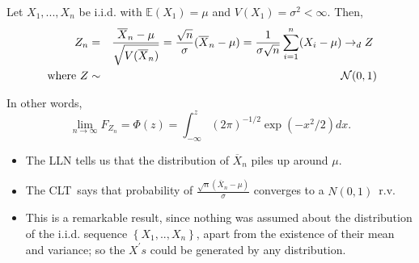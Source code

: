 \documentclass[notes=show]{beamer}
\begin{document}
\begin{frame}%


\begin{theorem}
Let $X_{1},...,X_{n}$ be i.i.d. with $\mathbb{E}\left( X_{1}\right) =\mu $
and $V\left( X_{1}\right) =\sigma ^{2}<\infty .$ Then, 
\begin{eqnarray*}
Z_{n} &=&\frac{\overline{X}_{n}-\mu }{\sqrt{V(\overline{X}_{n})}}=\frac{%
\sqrt{n}}{\sigma }(\overline{X}_{n}-\mu )=\frac{1}{\sigma \sqrt{n}}%
\sum_{i=1}^{n}(X_{i}-\mu )\rightarrow _{d}Z\text{ } \\
\text{\ where }Z &\sim &\mathcal{N}(0,1)
\end{eqnarray*}

In other words, 
\begin{equation*}
\lim_{n\rightarrow \infty }F_{Z_{n}}=\Phi (z)=\int_{-\infty }^{z}(2\pi
)^{-1/2}\exp (-x^{2}/2)dx.
\end{equation*}
\end{theorem}

\end{frame}%

\begin{frame}%


\begin{itemize}
\item The LLN tells us that the distribution of $\overline{X}_{n}$ piles up
around $\mu .$

\item The CLT\ says that probability of $\frac{\sqrt{n}\left( \bar{X}%
_{n}-\mu \right) }{\sigma }$ converges to a $N\left( 0,1\right) $\ r.v.

\item This is a remarkable result, since nothing was assumed about the
distribution of the i.i.d. sequence $\left\{ X_{1},..,X_{n}\right\} $, apart
from the existence of their mean and variance; so the $X^{\prime }s$ could
be generated by any distribution.
\end{itemize}

\end{frame}%
\end{document}
